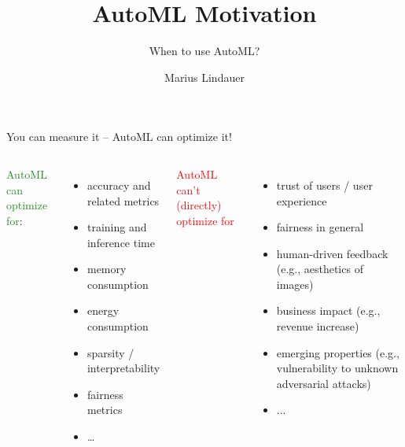 \documentclass[main]{subfiles}
\title[AutoML: Introduction]{AutoML Motivation}
\subtitle{When to use AutoML?}
\author[Marius Lindauer]{Marius Lindauer}
\date{}
\begin{document}
	
	\maketitle
	

\begin{frame}[c]{You can measure it -- AutoML can optimize it!}


\begin{columns}


\textcolor{ForestGreen}{AutoML can optimize for}:

\begin{itemize}
    \item accuracy and related metrics
    \item training and inference time
    \item memory consumption
    \item energy consumption
    \item sparsity / interpretability
    \item fairness metrics
    \item \ldots
\end{itemize}


\pause

\textcolor{Red}{AutoML can't (directly) optimize for}

\begin{itemize}
    \item trust of users / user experience
    \item fairness in general
    \item human-driven feedback (e.g., aesthetics of images)
    \item business impact (e.g., revenue increase)
    \item emerging properties (e.g., vulnerability to unknown adversarial attacks)
    \item ...
\end{itemize}

\end{columns}

\end{frame}
\end{document}
